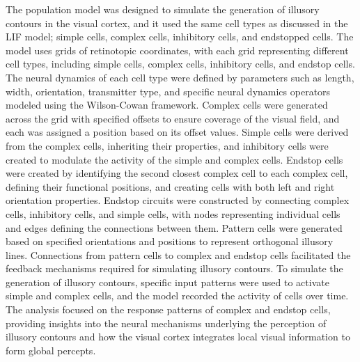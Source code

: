 \documentclass[12pt]{article}
\begin{document}
The population model was designed to simulate the generation of illusory contours in the visual cortex, and it used the same cell types as discussed in the LIF model; simple cells, complex cells, inhibitory cells, and endstopped cells. The model uses grids of retinotopic coordinates, with each grid representing different cell types, including simple cells, complex cells, inhibitory cells, and endstop cells. The neural dynamics of each cell type were defined by parameters such as length, width, orientation, transmitter type, and specific neural dynamics operators modeled using the Wilson-Cowan framework. Complex cells were generated across the grid with specified offsets to ensure coverage of the visual field, and each was assigned a position based on its offset values. Simple cells were derived from the complex cells, inheriting their properties, and inhibitory cells were created to modulate the activity of the simple and complex cells. Endstop cells were created by identifying the second closest complex cell to each complex cell, defining their functional positions, and creating cells with both left and right orientation properties. Endstop circuits were constructed by connecting complex cells, inhibitory cells, and simple cells, with nodes representing individual cells and edges defining the connections between them. Pattern cells were generated based on specified orientations and positions to represent orthogonal illusory lines. Connections from pattern cells to complex and endstop cells facilitated the feedback mechanisms required for simulating illusory contours. To simulate the generation of illusory contours, specific input patterns were used to activate simple and complex cells, and the model recorded the activity of cells over time. The analysis focused on the response patterns of complex and endstop cells, providing insights into the neural mechanisms underlying the perception of illusory contours and how the visual cortex integrates local visual information to form global percepts. 
\end{document}
